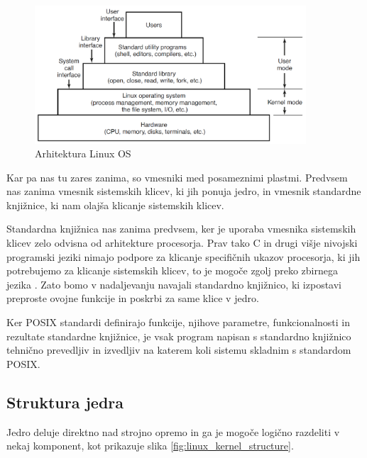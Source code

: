 \documentclass[a4paper,12pt,openright]{book}
\begin{document}
\begin{figure}[h!]
	\begin{center}
		\includegraphics[width=0.9\textwidth]{images/linux_layers.png}
	\end{center}
	\caption{Arhitektura Linux OS \cite{Tanenbaum_Bos_2023}}
	\label{fig:linux_architecture}
\end{figure}

Kar pa nas tu zares zanima, so vmesniki med posameznimi plastmi.
Predvsem nas zanima vmesnik sistemskih klicev, ki jih ponuja jedro, in vmesnik standardne knjižnice, ki nam olajša klicanje sistemskih klicev.

Standardna knjižnica nas zanima predvsem, ker je uporaba vmesnika sistemskih klicev zelo odvisna od arhitekture procesorja.
Prav tako C in drugi višje nivojski programski jeziki nimajo podpore za klicanje specifičnih ukazov procesorja, ki jih potrebujemo za klicanje sistemskih klicev, to je mogoče zgolj preko zbirnega jezika \cite{Tanenbaum_Bos_2023}.
Zato bomo v nadaljevanju navajali standardno knjižnico, ki izpostavi preproste ovojne funkcije in poskrbi za same klice v jedro.

Ker POSIX standardi definirajo funkcije, njihove parametre, funkcionalnosti in rezultate standardne knjižnice, je vsak program napisan s standardno knjižnico tehnično prevedljiv in izvedljiv na katerem koli sistemu skladnim s standardom POSIX.

\subsection{Struktura jedra}

Jedro deluje direktno nad strojno opremo in ga je mogoče logično razdeliti v nekaj komponent, kot prikazuje slika \ref{fig:linux_kernel_structure}.
\end{document}
